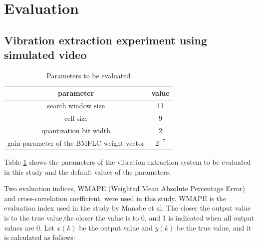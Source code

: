 \section{Evaluation}\label{section:evaluation}


\subsection{Vibration extraction experiment using simulated video}\label{subsection:eval:experiment1}

\begin{table}[tb]
  \centering
  \caption {Parameters to be evaluated}
  \label{table:bit_eval_parameter1}
  \begin{tabular}{|c|c|}
    \hline
    parameter   & value                \\ \hline \hline
    search window size & 11 \\\hline
    cell size   & 9          \\\hline
    quantization bit width   & 2      \\\hline
     gain parameter of the BMFLC weight vector & $2^{-7}$ \\ \hline
  \end{tabular}
\end{table}


Table \ref{table:bit_eval_parameter1} shows the parameters of the vibration extraction system
to be evaluated in this study and the default values of the parameters.


Two evaluation indices, WMAPE (Weighted Mean Absolute Percentage Error) and cross-correlation coefficient, were used in this study.
WMAPE is the evaluation index used in the study by Manabe et al.
The closer the output value is to the true value,the closer the value is to $0$, and 1 is indicated when all output values are $0$.
Let $x(k)$ be the output value and $y(k)$ be the true value, and it is calculated as follows:


